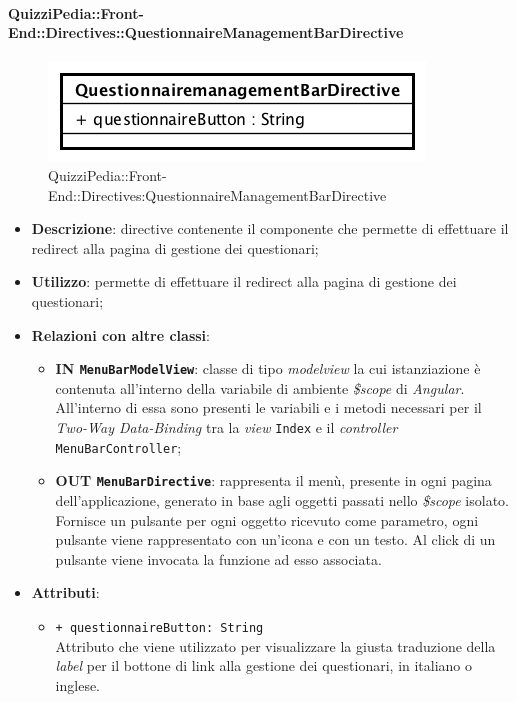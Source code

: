 \paragraph[QuizziPedia::Front-End::Directives\\::QuestionnaireManagementBarDirective]{QuizziPedia::Front-End::Directives::QuestionnaireManagementBarDirective}

\label{QuizziPedia::Front-End::Directives::QuestionnaireManagementBarDirective}
\begin{figure} [ht]
	\centering
	\includegraphics[scale=0.80]{UML/Classi/Front-End/QuizziPedia_Front-end_Directives_QuestionnaireManagementBarDirective.png}
	\caption{QuizziPedia::Front-End::Directives:QuestionnaireManagementBarDirective}
\end{figure} \FloatBarrier
\begin{itemize}
	\item \textbf{Descrizione}: directive contenente il componente che permette di effettuare il redirect alla pagina di gestione dei questionari;
	\item \textbf{Utilizzo}: permette di effettuare il redirect alla pagina di gestione dei questionari;
	\item \textbf{Relazioni con altre classi}:
	\begin{itemize}
		\item \textbf{IN \texttt{MenuBarModelView}}: classe di tipo \textit{modelview} la cui istanziazione è contenuta all'interno della variabile di ambiente \textit{\$scope} di \textit{Angular}. All'interno di essa sono presenti le variabili e i metodi necessari per il \textit{Two-Way Data-Binding} tra la \textit{view} \texttt{Index} e il \textit{controller} \texttt{MenuBarController};
		\item \textbf{OUT \texttt{MenuBarDirective}}: rappresenta il menù, presente in ogni pagina dell'applicazione, generato in base agli oggetti passati nello \textit{\$scope} isolato. Fornisce un pulsante per ogni oggetto ricevuto come parametro, ogni pulsante viene rappresentato con un’icona e con un testo. Al click di un pulsante viene invocata la funzione ad esso associata.  
	\end{itemize}
	\item \textbf{Attributi}:
	\begin{itemize}
		\item \texttt{+ questionnaireButton: String} \\ Attributo che viene utilizzato per visualizzare la giusta traduzione della \textit{label} per il bottone di link alla gestione dei questionari, in italiano o inglese.
	\end{itemize}
\end{itemize}